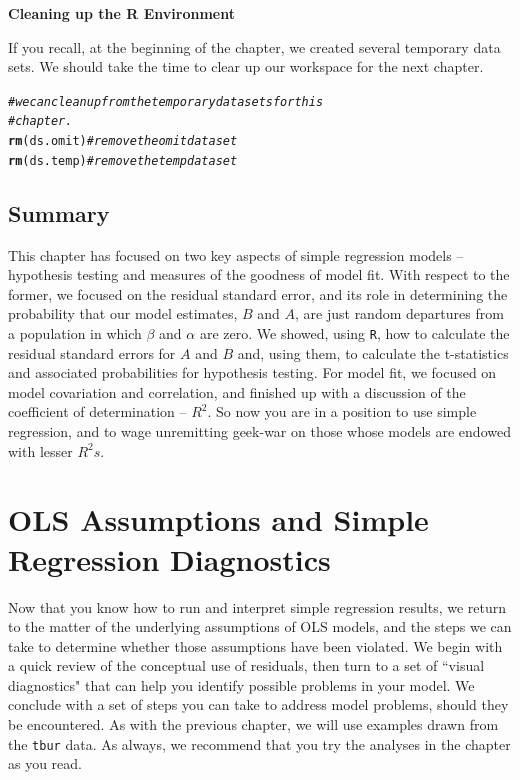 \documentclass[11pt,openany]{book}\usepackage[]{graphicx}\usepackage[]{color}
\makeatletter
\newcommand{\hlcom}[1]{\textcolor[rgb]{0.678,0.584,0.686}{\textit{#1}}}%
\newcommand{\hlstd}[1]{\textcolor[rgb]{0.345,0.345,0.345}{#1}}%
\newcommand{\hlkwd}[1]{\textcolor[rgb]{0.737,0.353,0.396}{\textbf{#1}}}%
\newenvironment{kframe}{%
 \def\at@end@of@kframe{}%
 \ifinner\ifhmode%
  \def\at@end@of@kframe{\end{minipage}}%
  \begin{minipage}{\columnwidth}%
 \fi\fi%
 \def\FrameCommand##1{\hskip\@totalleftmargin \hskip-\fboxsep
 \colorbox{shadecolor}{##1}\hskip-\fboxsep
     \hskip-\linewidth \hskip-\@totalleftmargin \hskip\columnwidth}%
 \MakeFramed {\advance\hsize-\width
   \@totalleftmargin\z@ \linewidth\hsize
   \@setminipage}}%
 {\par\unskip\endMakeFramed%
 \at@end@of@kframe}
\newenvironment{knitrout}{}{} %
\renewenvironment{knitrout}{\begin{singlespace}}{\end{singlespace}} %
\makeatother
\begin{document}
\noindent \textbf{Cleaning up the R Environment}

If you recall, at the beginning of the chapter, we created several temporary data sets.  We should take the time to clear up our workspace for the next chapter.
\begin{knitrout}
\color{fgcolor}\begin{kframe}
\begin{alltt}
\hlcom{# we can clean up from the temporary data sets for this}
\hlcom{# chapter.}
\hlkwd{rm}\hlstd{(ds.omit)}  \hlcom{#remove the omit data set}
\hlkwd{rm}\hlstd{(ds.temp)}  \hlcom{#remove the temp data set}
\end{alltt}
\end{kframe}
\end{knitrout}

\section{Summary} 

This chapter has focused on two key aspects of simple regression models -- hypothesis testing and  measures of the goodness of model fit. With respect to the former, we focused on the residual standard error, and its role in determining the probability that our model estimates, $B$ and $A$, are just random departures from a population in which $\beta$ and $\alpha$ are zero. We showed, using \texttt{R}, how to calculate the residual standard errors for $A$ and $B$ and, using them, to calculate the t-statistics and associated probabilities for hypothesis testing. For model fit, we focused on model covariation and correlation, and finished up with a discussion of the coefficient of determination -- $R^{2}$. So now you are in a position to use simple regression, and to wage unremitting geek-war on those whose models are endowed with lesser $R^{2}s$.




\chapter{OLS Assumptions and Simple Regression Diagnostics}

Now that you know how to run and interpret simple regression results, we return to the matter of the underlying assumptions of OLS models, and the steps we can take to determine whether those assumptions have been violated. We begin with a quick review of the conceptual use of residuals, then turn to a set of ``visual diagnostics" that can help you identify possible problems in your model. We conclude with a set of steps you can take to address model problems, should they be encountered. As with the previous chapter, we will use examples drawn from the \texttt{tbur} data.  As always, we recommend that you try the analyses in the chapter as you read.
\end{document}
